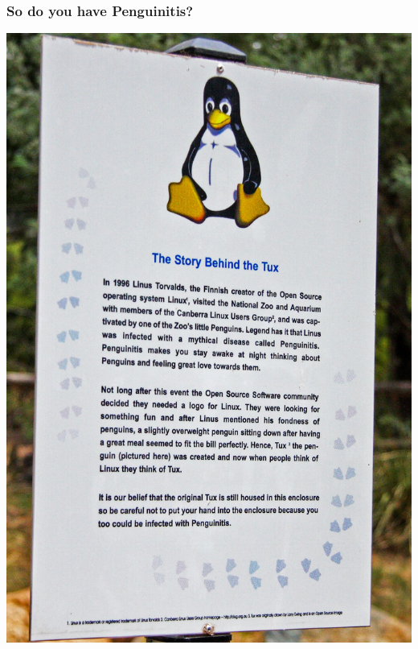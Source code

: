\documentclass{lug}
\begin{document}
\begin{frame}
    \frametitle{So do you have Penguinitis?}
    \centering
    \includegraphics[height=\paperheight-4em]{graphics/penguinitis}
\end{frame}
\end{document}
